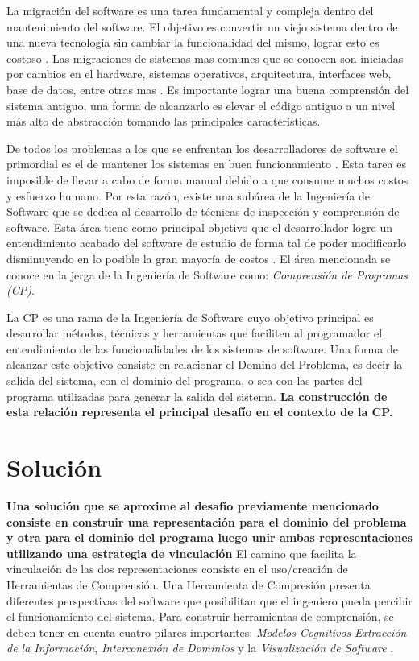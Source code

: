 \documentclass[12pt]{report}
\begin{document}
La migración del software es una tarea fundamental y compleja dentro del mantenimiento del software. El objetivo es convertir un viejo sistema dentro de una nueva tecnología sin cambiar la funcionalidad del mismo, lograr esto es costoso \cite{WHAFVR11}. Las migraciones de sistemas mas comunes que se conocen son iniciadas por cambios en el hardware, sistemas operativos, arquitectura, interfaces web, base de datos, entre otras mas \cite{MMFAF07}. Es importante lograr una buena comprensión del sistema antiguo, una forma de alcanzarlo es elevar el código antiguo a un nivel más alto de abstracción tomando las principales características.

De todos los problemas a los que se enfrentan los desarrolladores de software el primordial es el de mantener los sistemas en buen funcionamiento \cite{VMAVA95}. 
Esta tarea es imposible de llevar a cabo de forma manual debido a que consume muchos costos y esfuerzo humano. 
Por esta razón, existe una subárea de la Ingeniería de Software que se  
dedica al desarrollo de técnicas de inspección y comprensión de software. 
Esta área tiene como principal objetivo que el desarrollador logre un entendimiento 
acabado del software de estudio de forma tal de poder modificarlo disminuyendo en lo posible la gran mayoría de costos \cite{BRM10}. 
El área mencionada se conoce en la jerga de la Ingeniería de Software como: \textit{Comprensión de Programas (CP)}.

La CP es una rama de la Ingeniería de Software cuyo objetivo 
principal es desarrollar métodos, técnicas y herramientas que faciliten al programador 
el entendimiento de las funcionalidades de los sistemas de software.
Una forma de alcanzar este objetivo consiste en relacionar el Domino del Problema, 
es decir la salida del sistema, con el dominio del programa, o sea 
con las partes del programa utilizadas para generar la salida del sistema.
\textbf{La construcción de esta relación representa el principal desafío en el contexto de la CP.}



\section{Solución}

\textbf{Una solución que se aproxime al desafío previamente mencionado consiste en construir una representación para el dominio del problema y otra para el dominio del programa luego unir ambas representaciones utilizando una estrategia de vinculación} 
El camino que facilita la vinculación de las dos representaciones consiste en el uso/creación de Herramientas de Comprensión. 
Una Herramienta de Compresión presenta diferentes perspectivas del software que posibilitan que el ingeniero pueda percibir el funcionamiento del sistema. 
Para construir herramientas de comprensión, se deben tener en cuenta cuatro pilares importantes: \textit{Modelos Cognitivos}
\textit{Extracción de la Información},
\textit{Interconexión de Dominios} y la
\textit{Visualización de Software} \cite{STOREY99,BROOK82}.
\end{document}
